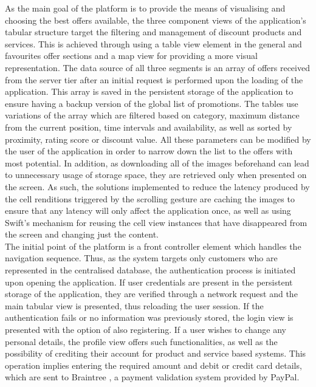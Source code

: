 As the main goal of the platform is to provide the means of visualising and choosing the best offers available, the three component views of the application's tabular structure target the filtering and management of discount products and services. This is achieved through using a table view element in the general and favourites offer sections and a map view for providing a more visual representation. The data source of all three segments is an array of offers received from the server tier after an initial request is performed upon the loading of the application. This array is saved in the persistent storage of the application to ensure having a backup version of the global list of promotions. The tables use variations of the array which are filtered based on category, maximum distance from the current position, time intervals and availability, as well as sorted by proximity, rating score or discount value. All these parameters can be modified by the user of the application in order to narrow down the list to the offers with most potential. In addition, as downloading all of the images beforehand can lead to unnecessary usage of storage space, they are retrieved only when presented on the screen. As such, the solutions implemented to reduce the latency produced by the cell renditions triggered by the scrolling gesture are caching the images to ensure that any latency will only affect the application once, as well as using Swift's mechanism for reusing the cell view instances that have disappeared from the screen and changing just the content.  \\

The initial point of the platform is a front controller element which handles the navigation sequence. Thus, as the system targets only customers who are represented in the centralised database, the authentication process is initiated upon opening the application. If user credentials are present in the persistent storage of the application, they are verified through a network request and the main tabular view is presented, thus reloading the user session. If the authentication fails or no information was previously stored, the login view is presented with the option of also registering. If a user wishes to change any personal details, the profile view offers such functionalities, as well as the possibility of crediting their account for product and service based systems. This operation implies entering the required amount and debit or credit card details, which are sent to Braintree \cite{braintree}, a payment validation system provided by PayPal. \\

